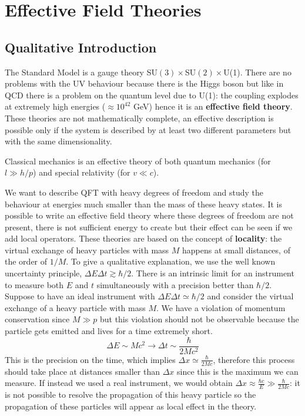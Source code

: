 \documentclass[../main.tex]{subfiles}
\begin{document}
\setchapterpreamble[u]{\margintoc}
\chapter[Effective Field Theories]{Effective Field Theories\footnotemark[0]}
\section{Qualitative Introduction}
The Standard Model is a gauge theory SU$(3)\times$SU$(2)\times$U(1). There are no problems with the UV behaviour because there is the Higgs boson but like in QCD there is a problem on the quantum level due to U(1): the coupling explodes at extremely high energies ($\approx10^{42}$ GeV) hence it is an \textbf{effective field theory}. These theories are not mathematically complete, an effective description is possible only if the system is described by at least two different parameters but with the same dimensionality.
\begin{example}
Classical mechanics is an effective theory of both quantum mechanics (for $l\gg h/p$) and special relativity (for $v\ll c$).
\end{example}
We want to describe QFT with heavy degrees of freedom and study the behaviour at energies much smaller than the mass of these heavy states. It is possible to write an effective field theory where these degrees of freedom are not present, there is not sufficient energy to create but their effect can be seen if we add local operators. These theories are based on the concept of \textbf{locality}: the virtual exchange of heavy particles with mass $M$ happens at small distances, of the order of $1/M$. To give a qualitative explanation, we use the well known uncertainty principle, $\Delta E\Delta t\gtrsim\hbar/2$. There is an intrinsic limit for an instrument to measure both $E$ and $t$ simultaneously with a precision better than $\hbar/2$. Suppose to have an ideal instrument with $\Delta E\Delta t\simeq\hbar/2$ and consider the virtual exchange of a heavy particle with mass $M$. We have a violation of momentum conservation since $M\gg p$ but this violation should not be observable because the particle gets emitted and lives for a time extremely short. 
\[
\Delta E\sim Mc^2\to\Delta t\sim\frac{\hbar}{2Mc^2}
\]
This is the precision on the time, which implies $\Delta x\simeq\frac{\hbar}{2Mc}$, therefore this process should take place at distances smaller than $\Delta x$ since this is the maximum we can measure. If instead we used a real instrument, we would obtain $\Delta x\approx\frac{\hbar c}{E}\gg \frac{\hbar}{2Mc}$: it is not possible to resolve the propagation of this heavy particle so the propagation of these particles will appear as local effect in the theory.
\end{document}
